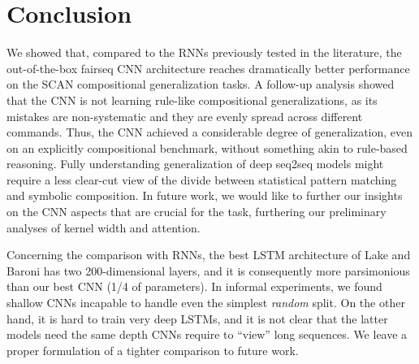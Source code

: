 \section{Conclusion}

We showed that, compared to the RNNs previously tested in the
literature, the out-of-the-box fairseq CNN architecture reaches
dramatically better performance on the SCAN compositional
generalization tasks. A follow-up analysis showed that the CNN
is not  learning rule-like compositional generalizations, as its
mistakes are non-systematic and they are evenly spread across different
commands. Thus, the CNN  achieved a considerable
degree of generalization, even on an explicitly compositional
benchmark, without something akin to rule-based reasoning. Fully
understanding generalization of deep seq2seq models might require a less
clear-cut view of the divide between statistical pattern matching and
symbolic composition. In future work, we would like to further our insights on the
CNN aspects that are crucial for the task, furthering our preliminary
analyses of kernel width and attention.

Concerning the comparison with RNNs, the best LSTM architecture of
Lake and Baroni has two 200-dimensional layers, and it is consequently
more parsimonious than our best CNN (1/4 of parameters). In informal
experiments, we found shallow CNNs incapable to handle even the
simplest \emph{random} split. On the other hand, it is hard to train
very deep LSTMs, and it is not clear that the latter models need the
same depth CNNs require to ``view'' long sequences. We
leave a proper formulation of a tighter comparison to future work.

